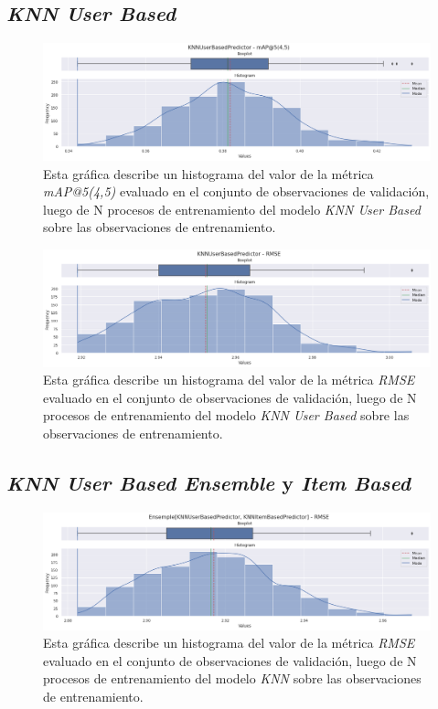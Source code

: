 \documentclass[11pt,a4paper,twoside]{thesis}
\begin{document}
\subsection{\textit{KNN User Based}}

\begin{figure}[!htb]
	\centering
	\includegraphics[width=15cm]{./images/metrics-knn-user-based-mapk.png}
	\caption{Esta gráfica describe un histograma del valor de la métrica
		\textit{mAP@5(4,5)} evaluado en el conjunto de observaciones de
		validación, luego de N procesos de entrenamiento del modelo
		\textit{KNN User Based} sobre las observaciones de entrenamiento.}
\end{figure}

\begin{figure}[!htb]
	\centering
	\includegraphics[width=15cm]{./images/metrics-knn-user-based-RMSE.png}
	\caption{Esta gráfica describe un histograma del valor de la métrica
		\textit{RMSE} evaluado en el conjunto de observaciones de validación,
		luego de N procesos de entrenamiento del modelo
		\textit{KNN User Based} sobre las observaciones de entrenamiento.}
\end{figure}

\clearpage

\subsection{\textit{KNN User Based Ensemble} y \textit{Item Based}}

\begin{figure}[!htb]
	\centering
	\includegraphics[width=15cm]{./images/metrics-knn-ensemple-RMSE.png}
	\caption{Esta gráfica describe un histograma del valor de la métrica
		\textit{RMSE} evaluado en el conjunto de observaciones de validación,
		luego de N procesos de entrenamiento del modelo \textit{KNN}
		sobre las observaciones de entrenamiento.}
\end{figure}
\end{document}
